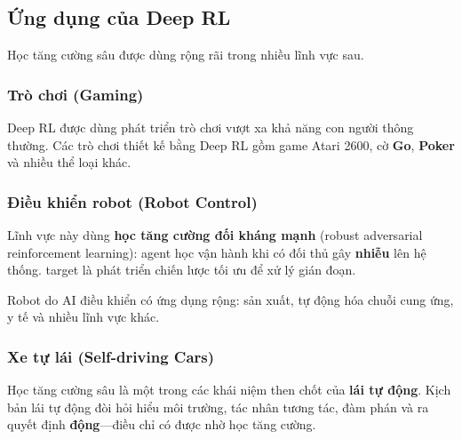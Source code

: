 \subsection{Ứng dụng của Deep RL}

\begin{ynghia}[title={Các lĩnh vực ứng dụng nổi bật}]
Học tăng cường sâu được dùng rộng rãi trong nhiều lĩnh vực sau.
\end{ynghia}

\subsubsection{Trò chơi (Gaming)}

\begin{vidu}[title={Trò chơi điện tử}]
Deep RL được dùng phát triển trò chơi vượt xa khả năng con người thông thường.
Các trò chơi thiết kế bằng Deep RL gồm game Atari 2600, cờ \textbf{Go}, \textbf{Poker} và nhiều thể loại khác.
\end{vidu}

\subsubsection{Điều khiển robot (Robot Control)}

\begin{phuongphap}[title={Học tăng cường đối kháng mạnh}]
Lĩnh vực này dùng \textbf{học tăng cường đối kháng mạnh} (robust adversarial reinforcement learning): agent học vận hành khi có đối thủ gây \textbf{nhiễu} lên hệ thống.
target là phát triển chiến lược tối ưu để xử lý gián đoạn.
\end{phuongphap}

\begin{vidu}[title={Robot trí tuệ nhân tạo}]
Robot do AI điều khiển có ứng dụng rộng: sản xuất, tự động hóa chuỗi cung ứng, y tế và nhiều lĩnh vực khác.
\end{vidu}

\subsubsection{Xe tự lái (Self-driving Cars)}

\begin{ynghia}[title={Lái tự động}]
Học tăng cường sâu là một trong các khái niệm then chốt của \textbf{lái tự động}.
Kịch bản lái tự động đòi hỏi hiểu môi trường, tác nhân tương tác, đàm phán và ra quyết định \textbf{động}---điều chỉ có được nhờ học tăng cường.
\end{ynghia}

